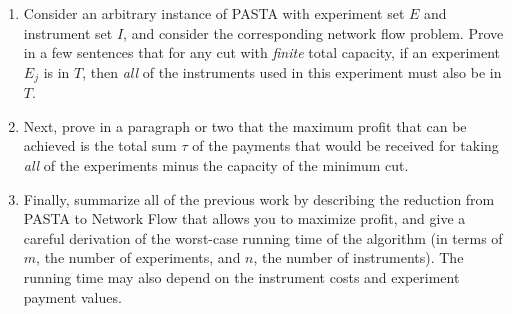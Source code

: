 \documentclass[12 pt, letterpaper]{hmcpset}
\begin{document}
\begin{problem}
	\begin{enumerate}
		\item[(e)] Consider an arbitrary instance of PASTA with experiment set $E$ and instrument set $I$, and consider the corresponding network flow problem. Prove in a few sentences that for any cut with \emph{finite} total capacity, if an experiment $E_{j}$ is in $T$, then \emph{all} of the instruments used in this experiment must also be in $T$.
 
		\item[(f)] Next, prove in a paragraph or two that the maximum profit that can be achieved is the total sum $\tau$ of the payments that would be received for taking \emph{all} of the experiments minus the capacity of the minimum cut.

		\item[(g)] Finally, summarize all of the previous work by describing the reduction from PASTA to Network Flow that allows you to maximize profit, and give a careful derivation of the worst-case running time of the algorithm (in terms of $m$, the number of experiments, and $n$, the number of instruments). The running time may also depend on the instrument costs and experiment payment values.
	\end{enumerate}
\end{problem}
\end{document}
